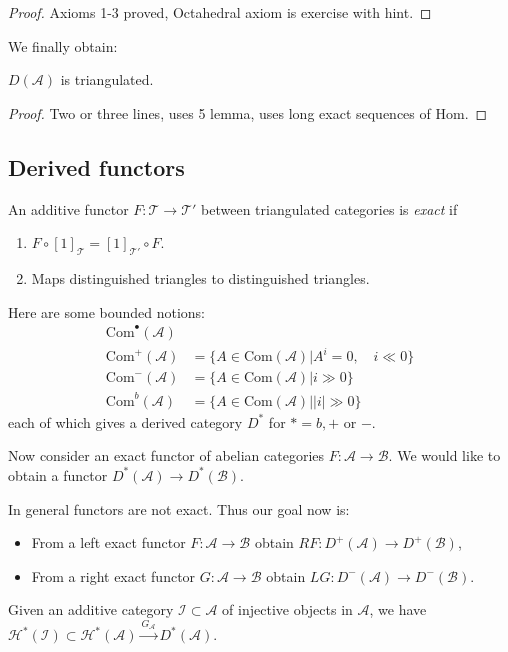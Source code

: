 \begin{proof}
Axioms 1-3 proved, Octahedral axiom is exercise with hint.
\end{proof}

We finally obtain:

\begin{lemma}
\label{lemma-derived-category-is-triangulated}
$D(\mathcal{A})$ is triangulated.
\end{lemma}

\begin{proof}
Two or three lines, uses 5 lemma, uses long exact sequences of $\text{Hom}$.
\end{proof}

\subsection*{Derived functors}
\label{subsection-derived-functors}

\begin{definition}
\label{definition-additive-exact-functor}
An additive functor $F:\mathcal{T} \to \mathcal{T}'$ between triangulated
categories is {\it exact} if
\begin{enumerate}
\item $F \circ [1]_{\mathcal{T}}=[1]_{\mathcal{T}'}\circ F$.
\item Maps distinguished triangles to distinguished triangles.
\end{enumerate}
\end{definition}

\medskip\noindent
Here are some bounded notions:
\begin{align*}
\text{Com}^\bullet(\mathcal{A})&\\
\text{Com}^+(\mathcal{A})&=\{A\in \text{Com}(\mathcal{A})
|A^i=0,\quad i\ll 0\}\\
\text{Com}^-(\mathcal{A})&=\{A\in \text{Com}(\mathcal{A})|i \gg 0\}\\
\text{Com}^b(\mathcal{A})&=\{A \in \text{Com}(\mathcal{A})||i|\gg 0\}
\end{align*}
each of which gives a derived category $D^*$ for $*=b,+$ or $-$.

Now consider an exact functor of abelian categories $F:\mathcal{A} \to
\mathcal{B}$. We would like to obtain a functor
$D^*(\mathcal{A}) \to D^*(\mathcal{B})$.

In general functors are not exact. Thus our goal now is:
\begin{itemize}
\item From a left exact functor $F:\mathcal{A} \to \mathcal{B}$ obtain
$RF:D^+(\mathcal{A})\to D^+(\mathcal{B})$,
\item From a right exact functor $G:\mathcal{A}\to \mathcal{B}$ obtain
$LG:D^-(\mathcal{A})\to D^-(\mathcal{B})$.
\end{itemize}
Given an additive category $\mathcal{I} \subset \mathcal{A}$ of injective
objects in $\mathcal{A}$, we have  $\mathcal{H}^* (\mathcal{I})\subset 
\mathcal{H}^* (\mathcal{A}) \xrightarrow{G_{\mathcal{A}}}D^*(\mathcal{A})$.

